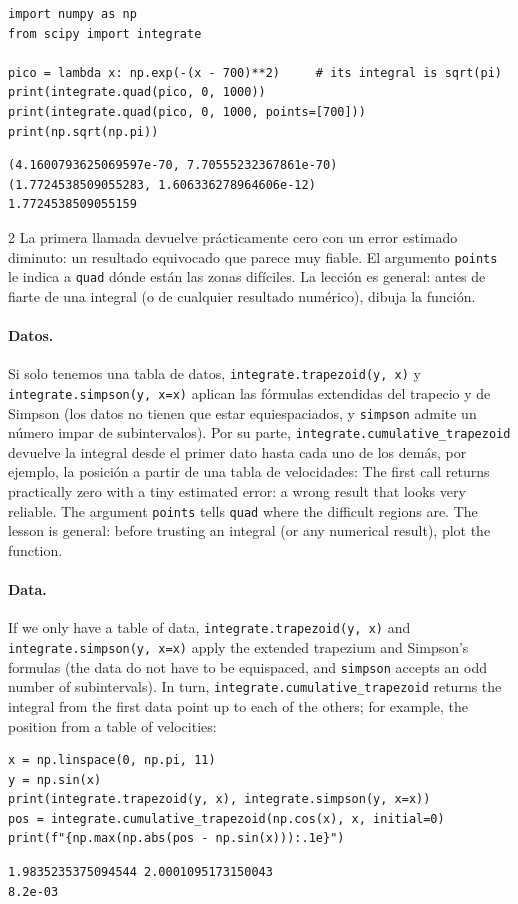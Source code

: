 \begin{verbatim}
import numpy as np
from scipy import integrate

pico = lambda x: np.exp(-(x - 700)**2)     # its integral is sqrt(pi)
print(integrate.quad(pico, 0, 1000))
print(integrate.quad(pico, 0, 1000, points=[700]))
print(np.sqrt(np.pi))
\end{verbatim}
\begin{verbatim}
(4.1600793625069597e-70, 7.70555232367861e-70)
(1.7724538509055283, 1.606336278964606e-12)
1.7724538509055159
\end{verbatim}
\begin{paracol}{2}
La primera llamada devuelve prácticamente cero con un error estimado diminuto: un resultado equivocado que parece muy fiable. El argumento \texttt{points} le indica a \texttt{quad} dónde están las zonas difíciles. La lección es general: antes de fiarte de una integral (o de cualquier resultado numérico), dibuja la función.

\paragraph*{Datos.} Si solo tenemos una tabla de datos, \texttt{integrate.trapezoid(y, x)} y \texttt{integrate.simpson(y, x=x)} aplican las fórmulas extendidas del trapecio y de Simpson (los datos no tienen que estar equiespaciados, y \texttt{simpson} admite un número impar de subintervalos). Por su parte, \texttt{integrate.cumulative_trapezoid} devuelve la integral desde el primer dato hasta cada uno de los demás, por ejemplo, la posición a partir de una tabla de velocidades:
\switchcolumn
The first call returns practically zero with a tiny estimated error: a wrong result that looks very reliable. The argument \texttt{points} tells \texttt{quad} where the difficult regions are. The lesson is general: before trusting an integral (or any numerical result), plot the function.

\paragraph*{Data.} If we only have a table of data, \texttt{integrate.trapezoid(y, x)} and \texttt{integrate.simpson(y, x=x)} apply the extended trapezium and Simpson's formulas (the data do not have to be equispaced, and \texttt{simpson} accepts an odd number of subintervals). In turn, \texttt{integrate.cumulative_trapezoid} returns the integral from the first data point up to each of the others; for example, the position from a table of velocities:
\end{paracol}
\begin{verbatim}
x = np.linspace(0, np.pi, 11)
y = np.sin(x)
print(integrate.trapezoid(y, x), integrate.simpson(y, x=x))
pos = integrate.cumulative_trapezoid(np.cos(x), x, initial=0)
print(f"{np.max(np.abs(pos - np.sin(x))):.1e}")
\end{verbatim}
\begin{verbatim}
1.9835235375094544 2.0001095173150043
8.2e-03
\end{verbatim}

